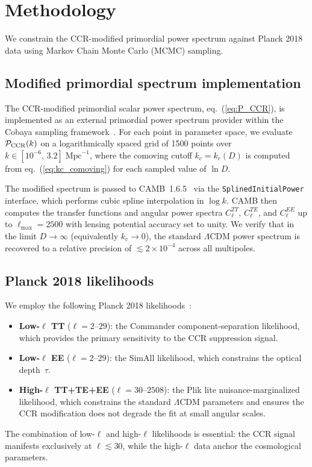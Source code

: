
\section{Methodology}
\label{sec:methodology}

We constrain the CCR-modified primordial power spectrum against
Planck 2018 data using Markov Chain Monte Carlo (MCMC) sampling.

\subsection{Modified primordial spectrum implementation}

The CCR-modified primordial scalar power spectrum, eq.~(\ref{eq:P_CCR}),
is implemented as an external primordial power spectrum provider within
the Cobaya sampling framework~\cite{Torrado:2021}. For each point in
parameter space, we evaluate $\mathcal{P}_{\rm CCR}(k)$ on a
logarithmically spaced grid of 1500 points over
$k \in [10^{-6},\,3.2]\;\mathrm{Mpc}^{-1}$, where the comoving cutoff
$k_c = k_c(D)$ is computed from eq.~(\ref{eq:kc_comoving}) for each
sampled value of $\ln D$.

The modified spectrum is passed to CAMB~1.6.5~\cite{Lewis:1999} via
the \texttt{SplinedInitialPower} interface, which performs cubic spline
interpolation in $\log k$. CAMB then computes the transfer functions
and angular power spectra $C_\ell^{TT}$, $C_\ell^{TE}$, and
$C_\ell^{EE}$ up to $\ell_{\max} = 2500$ with lensing potential
accuracy set to unity. We verify that in the limit $D \to \infty$ (equivalently $k_c \to 0$),
the standard $\Lambda$CDM power spectrum is recovered to a relative 
precision of $\lesssim 2 \times 10^{-4}$ across all multipoles.


\subsection{Planck 2018 likelihoods}

We employ the following Planck 2018
likelihoods~\cite{Planck:2018likelihood}:
\begin{itemize}
  \item \textbf{Low-$\ell$ TT} ($\ell = 2$--$29$): the Commander
    component-separation likelihood, which provides the primary
    sensitivity to the CCR suppression signal.
  \item \textbf{Low-$\ell$ EE} ($\ell = 2$--$29$): the SimAll
    likelihood, which constrains the optical depth~$\tau$.
  \item \textbf{High-$\ell$ TT+TE+EE} ($\ell = 30$--$2508$): the
    Plik lite nuisance-marginalized likelihood, which constrains the
    standard $\Lambda$CDM parameters and ensures the CCR modification
    does not degrade the fit at small angular scales.
\end{itemize}
The combination of low-$\ell$ and high-$\ell$ likelihoods is essential:
the CCR signal manifests exclusively at $\ell \lesssim 30$, while the
high-$\ell$ data anchor the cosmological parameters.

